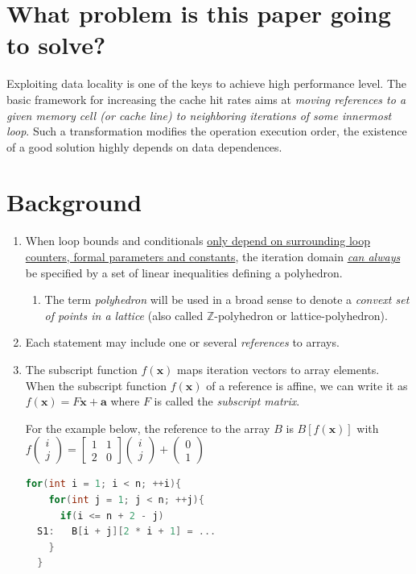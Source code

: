 \section {What problem is this paper going to solve?}

Exploiting data locality is one of the keys to achieve high performance level.
The basic framework for increasing the cache hit rates aims at \emph{moving
references to a given memory cell (or cache line) to neighboring iterations
of some innermost loop}. Such a transformation modifies the operation execution
order, the existence of a good solution highly depends on data dependences.

\section {Background}

\begin{enumerate}
  \item When loop bounds and conditionals \ul{only depend on surrounding loop counters, formal
  parameters and constants}, the iteration domain \ul{\emph{can always}}
  be specified by a set of linear inequalities defining a polyhedron.
  \begin{enumerate}
    \item The term \emph{polyhedron} will be used in a broad sense to denote a \emph{convext
    set of points in a lattice} (also called $\mathbb{Z}$-polyhedron or lattice-polyhedron).
  \end{enumerate}

  \item Each statement may include {\color{red}one or several} \emph{references} to arrays.
  \item The subscript function $f(\bm{x})$ maps iteration vectors to array elements.
  When the subscript function $f(\bm{x})$ of a reference is affine, we can write it as
  $f(\bm{x}) = F\bm{x} + \bm{a}$ where $F$ is called the \emph{subscript matrix}.

  For the example below, the {\color{red}reference to the array} $B$ is
  $B\left[f(\bm{x})\right]$ with $f\left( \begin{matrix} i\\j \end{matrix} \right)=
  \begin{bmatrix}1 &1\\2 &0\end{bmatrix} \left( \begin{matrix} i \\ j\end{matrix}\right)
    + \left( \begin{matrix} 0 \\ 1\end{matrix}\right)$

  \begin{lstlisting}[language=C++]
  for(int i = 1; i < n; ++i){
    for(int j = 1; j < n; ++j){
      if(i <= n + 2 - j)
  S1:   B[i + j][2 * i + 1] = ...
    }
  }
  \end{lstlisting}

\end{enumerate}

